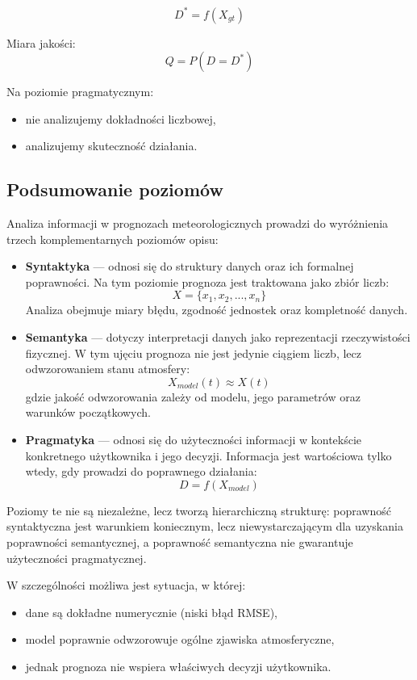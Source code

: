 \documentclass[a4paper,12pt]{article}
\begin{document}
\[
D^* = f(X_{gt})
\]

Miara jakości:
\[
Q = P(D = D^*)
\]

Na poziomie pragmatycznym:
\begin{itemize}
    \item nie analizujemy dokładności liczbowej,
    \item analizujemy skuteczność działania.
\end{itemize}

\subsection{Podsumowanie poziomów}

Analiza informacji w prognozach meteorologicznych prowadzi do wyróżnienia
trzech komplementarnych poziomów opisu:

\begin{itemize}
    \item \textbf{Syntaktyka} — odnosi się do struktury danych oraz ich formalnej poprawności.
    Na tym poziomie prognoza jest traktowana jako zbiór liczb:
    \[
    X = \{x_1, x_2, ..., x_n\}
    \]
    Analiza obejmuje miary błędu, zgodność jednostek oraz kompletność danych.

    \item \textbf{Semantyka} — dotyczy interpretacji danych jako reprezentacji
    rzeczywistości fizycznej. W tym ujęciu prognoza nie jest jedynie ciągiem liczb,
    lecz odwzorowaniem stanu atmosfery:
    \[
    X_{model}(t) \approx X(t)
    \]
    gdzie jakość odwzorowania zależy od modelu, jego parametrów oraz warunków początkowych.

    \item \textbf{Pragmatyka} — odnosi się do użyteczności informacji w kontekście
    konkretnego użytkownika i jego decyzji. Informacja jest wartościowa tylko wtedy,
    gdy prowadzi do poprawnego działania:
    \[
    D = f(X_{model})
    \]
\end{itemize}

Poziomy te nie są niezależne, lecz tworzą hierarchiczną strukturę:
poprawność syntaktyczna jest warunkiem koniecznym, lecz niewystarczającym
dla uzyskania poprawności semantycznej, a poprawność semantyczna nie gwarantuje
użyteczności pragmatycznej.

W szczególności możliwa jest sytuacja, w której:
\begin{itemize}
    \item dane są dokładne numerycznie (niski błąd RMSE),
    \item model poprawnie odwzorowuje ogólne zjawiska atmosferyczne,
    \item jednak prognoza nie wspiera właściwych decyzji użytkownika.
\end{itemize}
\end{document}

